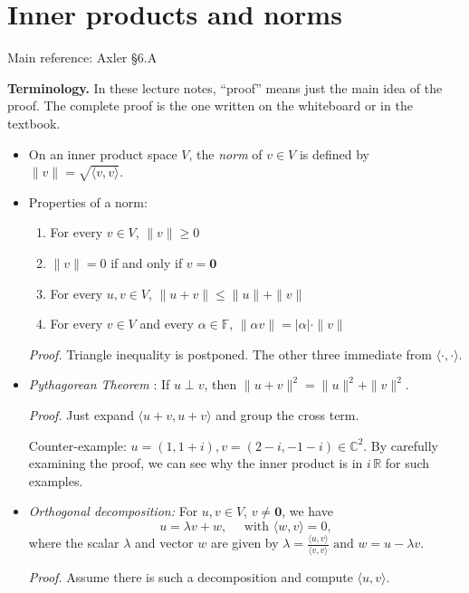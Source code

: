 \documentclass[11pt]{article}
\newcommand{\1}{\mathbf{1}}
\newcommand{\inner}[2]{\langle #1, #2 \rangle}
\newcommand{\0}{\mathbf{0}}
\newcommand{\C}{\mathbb{C}}
\newcommand{\R}{\mathbb{R}}
\renewcommand{\leq}{\leqslant}
\renewcommand{\geq}{\geqslant}
\begin{document}
{\clearpage
\section{Inner products and norms}

Main reference:
Axler \S6.A

\textbf{Terminology.}
In these lecture notes, ``proof'' means just the main idea of the proof.
The complete proof is the one written on the whiteboard or in the textbook.

\begin{itemize}

\item

On an inner product space $V$, the \emph{norm} of $v\in V$ is defined by $\|v\|=\sqrt{\langle v,v\rangle}$.
\item

Properties of a norm:
\begin{enumerate}
\item For every $v\in V$, $\|v\| \geq 0$
\item $\|v\|=0$ if and only if ${v}=\mathbf{0}$
\item For every $u,v\in V$, $\|u+v\|\leq \|u\|+\|v\|$
\item For every $v\in V$ and every $\alpha\in\mathbb{F}$, $\|\alpha v\|=|\alpha|\cdot\|v\|$
\end{enumerate}

\emph{Proof.}
Triangle inequality is postponed. The other three immediate from $\inner{\cdot}{\cdot}$.

\item

\emph{Pythagorean Theorem} : If $u \perp v$, then $\|u+v\|^2=\|u\|^2+\|v\|^2$.

\emph{Proof.}
Just expand $ \inner{u+v}{u+v} $ and group the cross term.

Counter-example: $u=(1,1+i),v=(2-i,-1-i) \in \C^2$.
By carefully examining the proof, we can see why the inner product is in $i\,\R$ for such examples.

\item

\emph{Orthogonal decomposition:} For $u,v\in V$, $v\neq \0$, we have
\[
u= \lambda v+w , \quad \text{ with }\langle w,v\rangle=0,
\]
where the scalar $\lambda$ and vector $w$ are given by 
\(
\lambda = \frac{\langle u,v\rangle}{\inner{v}{v}}
\text{ and }
w = u-\lambda v.
\)

\emph{Proof.}
Assume there is such a decomposition and compute $\inner{u}{v}$.


\end{itemize}}
\end{document}
